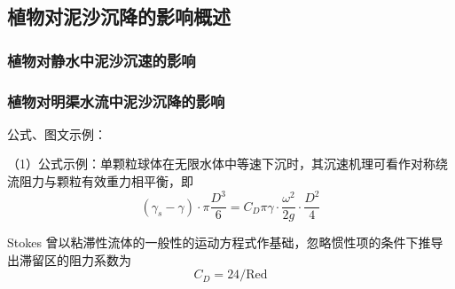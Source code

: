 \documentclass{HHUBachelorThesis}
\begin{document}
\subsection{植物对泥沙沉降的影响概述}
\subsubsection{植物对静水中泥沙沉速的影响}
\subsubsection{植物对明渠水流中泥沙沉降的影响}

\clearpage

公式、图文示例：

（1）公式示例：单颗粒球体在无限水体中等速下沉时，其沉速机理可看作对称绕流阻力与颗粒有效重力相平衡，即 \begin{equation}
    (\gamma_s - \gamma) \cdot \pi \frac{D^3}{6} = C_D \pi \gamma \cdot \frac{\omega^2}{2 g} \cdot \frac{D^2}{4}
\end{equation}

Stokes 曾以粘滞性流体的一般性的运动方程式作基础，忽略惯性项的条件下推导出滞留区的阻力系数为 \begin{equation}
    C_D = 24 / \mathrm{Red}
\end{equation}
\end{document}
